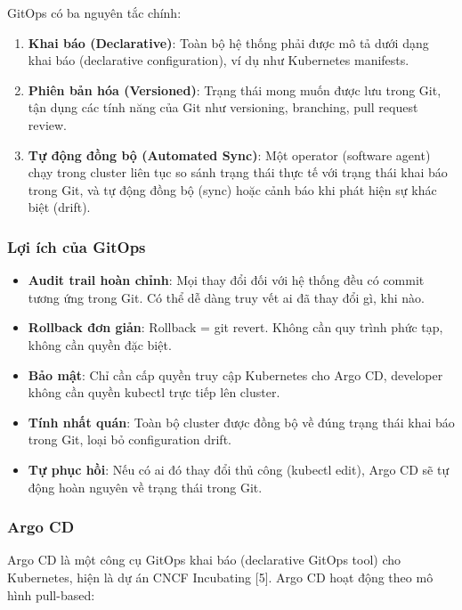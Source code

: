 \documentclass[13pt,a4paper,twoside]{extarticle}
\begin{document}
GitOps có ba nguyên tắc chính:

\begin{enumerate}[leftmargin=*,nosep]
  \item \textbf{Khai báo (Declarative)}: Toàn bộ hệ thống phải được mô tả dưới dạng khai báo (declarative configuration), ví dụ như Kubernetes manifests.
  \item \textbf{Phiên bản hóa (Versioned)}: Trạng thái mong muốn được lưu trong Git, tận dụng các tính năng của Git như versioning, branching, pull request review.
  \item \textbf{Tự động đồng bộ (Automated Sync)}: Một operator (software agent) chạy trong cluster liên tục so sánh trạng thái thực tế với trạng thái khai báo trong Git, và tự động đồng bộ (sync) hoặc cảnh báo khi phát hiện sự khác biệt (drift).
\end{enumerate}

\subsubsection{Lợi ích của GitOps}

\begin{itemize}[leftmargin=*,nosep]
  \item \textbf{Audit trail hoàn chỉnh}: Mọi thay đổi đối với hệ thống đều có commit tương ứng trong Git. Có thể dễ dàng truy vết ai đã thay đổi gì, khi nào.
  \item \textbf{Rollback đơn giản}: Rollback = git revert. Không cần quy trình phức tạp, không cần quyền đặc biệt.
  \item \textbf{Bảo mật}: Chỉ cần cấp quyền truy cập Kubernetes cho Argo CD, developer không cần quyền kubectl trực tiếp lên cluster.
  \item \textbf{Tính nhất quán}: Toàn bộ cluster được đồng bộ về đúng trạng thái khai báo trong Git, loại bỏ configuration drift.
  \item \textbf{Tự phục hồi}: Nếu có ai đó thay đổi thủ công (kubectl edit), Argo CD sẽ tự động hoàn nguyên về trạng thái trong Git.
\end{itemize}

\subsubsection{Argo CD}

Argo CD là một công cụ GitOps khai báo (declarative GitOps tool) cho Kubernetes, hiện là dự án CNCF Incubating [5]. Argo CD hoạt động theo mô hình pull-based:
\end{document}
